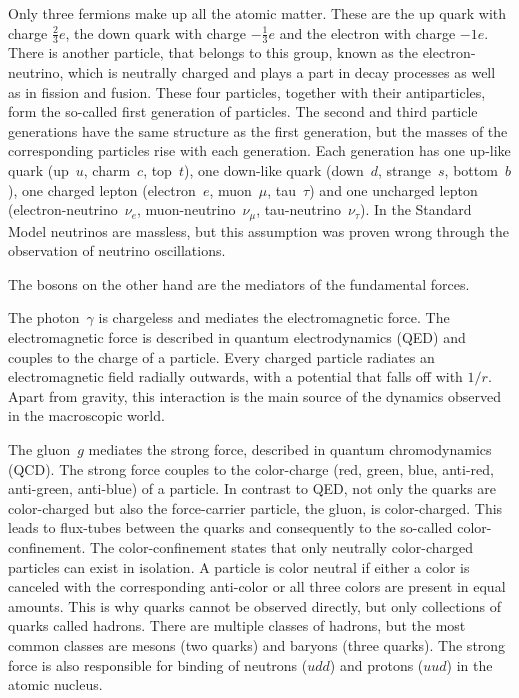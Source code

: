 Only three fermions make up all the atomic matter. 
These are the up quark with charge $\frac{2}{3}e$, the down quark with charge $-\frac{1}{3}e$ and the electron with charge $-1e$.
There is another particle, that belongs to this group, known as the electron-neutrino, which is neutrally charged and plays a part in decay processes as well as in fission and fusion.
These four particles, together with their antiparticles, form the so-called first generation of particles.
The second and third particle generations have the same structure as the first generation, but the masses of the corresponding particles rise with each generation.
Each generation has one up-like quark (up~$u$, charm~$c$, top~$t$), one down-like quark (down~$d$, strange~$s$, bottom~$b$), one charged lepton (electron~$e$, muon~$\mu$, tau~$\tau$) and one uncharged lepton (electron-neutrino~$\nu_e$, muon-neutrino~$\nu_\mu$, tau-neutrino~$\nu_\tau$).
In the Standard Model neutrinos are massless, but this assumption was proven wrong through the observation of neutrino oscillations. \cite{Fukuda1998,Ahmad2002}

The bosons on the other hand are the mediators of the fundamental forces.

The photon~$\gamma$ is chargeless and mediates the electromagnetic force.
The electromagnetic force is described in quantum electrodynamics (QED) and couples to the charge of a particle.
Every charged particle radiates an electromagnetic field radially outwards, with a potential that falls off with $1/r$.
Apart from gravity, this interaction is the main source of the dynamics observed in the macroscopic world.

The gluon~$g$ mediates the strong force, described in quantum chromodynamics (QCD).
The strong force couples to the color-charge (red, green, blue, anti-red, anti-green, anti-blue) of a particle.
In contrast to QED, not only the quarks are color-charged but also the force-carrier particle, the gluon, is color-charged.
This leads to flux-tubes between the quarks and consequently to the so-called color-confinement.
The color-confinement states that only neutrally color-charged particles can exist in isolation.
A particle is color neutral if either a color is canceled with the corresponding anti-color or all three colors are present in equal amounts.
This is why quarks cannot be observed directly, but only collections of quarks called hadrons.
There are multiple classes of hadrons, but the most common classes are mesons (two quarks) and baryons (three quarks).
The strong force is also responsible for binding of neutrons ($udd$) and protons ($uud$) in the atomic nucleus.

